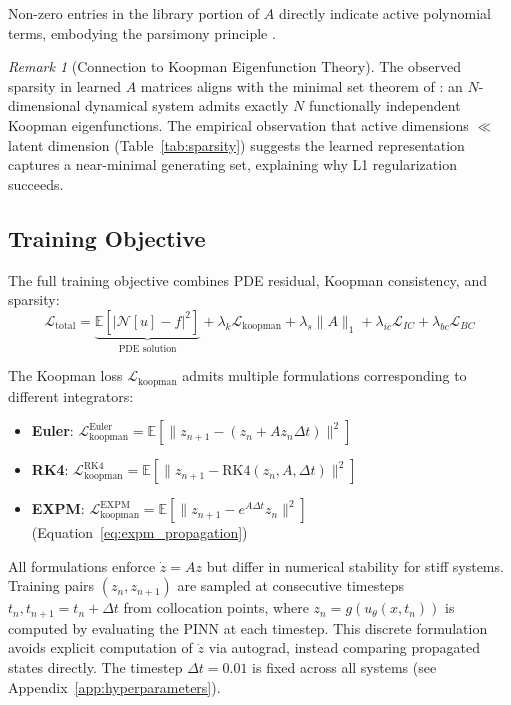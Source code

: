 \documentclass{article}
\theoremstyle{remark}
\newtheorem{remark}{Remark}
\begin{document}
Non-zero entries in the library portion of $A$ directly indicate active polynomial terms, embodying the parsimony principle \citep{ma2022principles}.

\begin{remark}[Connection to Koopman Eigenfunction Theory]
\label{rem:minimal_set}
The observed sparsity in learned $A$ matrices aligns with the minimal set theorem of \citet{cohen2025koopman}: an $N$-dimensional dynamical system admits exactly $N$ functionally independent Koopman eigenfunctions. The empirical observation that active dimensions $\ll$ latent dimension (Table~\ref{tab:sparsity}) suggests the learned representation captures a near-minimal generating set, explaining why L1 regularization succeeds.
\end{remark}

\subsection{Training Objective}

The full training objective combines PDE residual, Koopman consistency, and sparsity:
\begin{equation}
\mathcal{L}_{\text{total}} = \underbrace{\mathbb{E}\left[|\mathcal{N}[u] - f|^2\right]}_{\text{PDE solution}} + \lambda_k \mathcal{L}_{\text{koopman}} + \lambda_s\|A\|_1 + \lambda_{ic}\mathcal{L}_{IC} + \lambda_{bc}\mathcal{L}_{BC}
\end{equation}

The Koopman loss $\mathcal{L}_{\text{koopman}}$ admits multiple formulations corresponding to different integrators:
\begin{itemize}
\item \textbf{Euler}: $\mathcal{L}_{\text{koopman}}^{\text{Euler}} = \mathbb{E}[\|z_{n+1} - (z_n + Az_n\Delta t)\|^2]$
\item \textbf{RK4}: $\mathcal{L}_{\text{koopman}}^{\text{RK4}} = \mathbb{E}[\|z_{n+1} - \text{RK4}(z_n, A, \Delta t)\|^2]$
\item \textbf{EXPM}: $\mathcal{L}_{\text{koopman}}^{\text{EXPM}} = \mathbb{E}[\|z_{n+1} - e^{A\Delta t}z_n\|^2]$ (Equation~\ref{eq:expm_propagation})
\end{itemize}
All formulations enforce $\dot{z} = Az$ but differ in numerical stability for stiff systems. Training pairs $(z_n, z_{n+1})$ are sampled at consecutive timesteps $t_n, t_{n+1} = t_n + \Delta t$ from collocation points, where $z_n = g(u_\theta(x, t_n))$ is computed by evaluating the PINN at each timestep. This discrete formulation avoids explicit computation of $\dot{z}$ via autograd, instead comparing propagated states directly. The timestep $\Delta t = 0.01$ is fixed across all systems (see Appendix~\ref{app:hyperparameters}).
\end{document}
